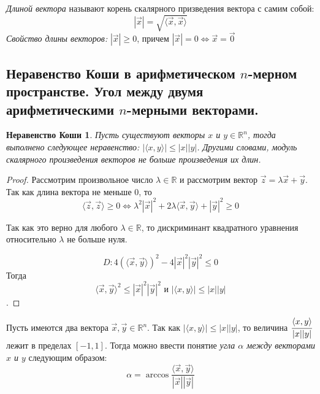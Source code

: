 \documentclass[a4paper, 12pt]{article}
\newtheorem*{cauchy_inequality}{Неравенство Коши}
\begin{document}
\textit{Длиной вектора} называют корень скалярного призведения вектора с самим собой: \[|\vec{x}| = \sqrt{\langle\vec{x}, \vec{x}\rangle}\]
\textit{Свойство длины векторов:} $|\vec{x}| \geqslant 0$, причем $|\vec{x}| =  0 \iff \vec{x} = \vec{0}$

\subsection{Неравенство Коши в арифметическом $n$-мерном пространстве. Угол между двумя арифметическими $n$-мерными векторами.}
\begin{cauchy_inequality}
Пусть существуют векторы $x$ и $y \in \mathbb{R}^n$, тогда выполнено следующее неравенство: $|\langle x, y\rangle| \leqslant |x||y|$. Другими словами, модуль скалярного произведения векторов не больше произведения их длин.
\end{cauchy_inequality}
\begin{proof}
Рассмотрим произвольное число $\lambda \in \mathbb{R}$ и рассмотрим вектор $\vec{z} = \lambda\vec{x} + \vec{y}$. Так как длина вектора не меньше 0, то
\[\langle \vec{z}, \vec{z} \rangle \geqslant 0 \Longleftrightarrow \lambda^2|\vec{x}|^2 + 2\lambda\langle \vec{x}, \vec{y} \rangle + |\vec{y}|^2 \geqslant 0\]

Так как это верно для любого $\lambda \in \mathbb{R}$, то дискриминант квадратного уравнения относительно $\lambda$ не больше нуля. 

\[D: 4(\langle \vec{x}, \vec{y} \rangle)^2 - 4|\vec{x}|^2|\vec{y}|^2 \leqslant 0\]Тогда \[\langle \vec{x}, \vec{y} \rangle^2 \leqslant |\vec{x}|^2|\vec{y}|^2\text{ и }|\langle x, y\rangle| \leqslant |x||y|\].
\end{proof}
Пусть имеются два вектора $\vec{x}, \vec{y} \in \mathbb{R}^n$. Так как $|\langle x, y\rangle| \leqslant |x||y|$, то величина $\cfrac{\langle x, y\rangle}{|x||y|}$ лежит в пределах  $[-1, 1]$. Тогда можно ввести понятие \textit{угла $\alpha$ между векторами $x$ и $y$} следующим образом:
\[\alpha = \arccos \frac{\langle\vec{x}, \vec{y}\rangle} {|\vec{x}||\vec{y}|}\]

\end{document}

